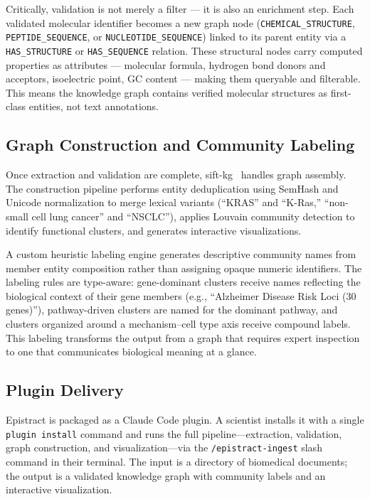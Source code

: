 Critically, validation is not merely a filter --- it is also an enrichment step. Each validated molecular identifier becomes a new graph node (\texttt{CHEMICAL\_STRUCTURE}, \texttt{PEPTIDE\_SEQUENCE}, or \texttt{NUCLEOTIDE\_SEQUENCE}) linked to its parent entity via a \texttt{HAS\_STRUCTURE} or \texttt{HAS\_SEQUENCE} relation. These structural nodes carry computed properties as attributes --- molecular formula, hydrogen bond donors and acceptors, isoelectric point, GC content --- making them queryable and filterable. This means the knowledge graph contains verified molecular structures as first-class entities, not text annotations.

\subsection{Graph Construction and Community Labeling}

Once extraction and validation are complete, sift-kg~\cite{sifkg2024} handles graph assembly. The construction pipeline performs entity deduplication using SemHash and Unicode normalization to merge lexical variants (``KRAS'' and ``K-Ras,'' ``non-small cell lung cancer'' and ``NSCLC''), applies Louvain community detection to identify functional clusters, and generates interactive visualizations.

A custom heuristic labeling engine generates descriptive community names from member entity composition rather than assigning opaque numeric identifiers. The labeling rules are type-aware: gene-dominant clusters receive names reflecting the biological context of their gene members (e.g., ``Alzheimer Disease Risk Loci (30 genes)''), pathway-driven clusters are named for the dominant pathway, and clusters organized around a mechanism--cell type axis receive compound labels. This labeling transforms the output from a graph that requires expert inspection to one that communicates biological meaning at a glance.

\subsection{Plugin Delivery}

Epistract is packaged as a Claude Code plugin. A scientist installs it with a single \texttt{plugin install} command and runs the full pipeline---extraction, validation, graph construction, and visualization---via the \texttt{/epistract-ingest} slash command in their terminal. The input is a directory of biomedical documents; the output is a validated knowledge graph with community labels and an interactive visualization.

